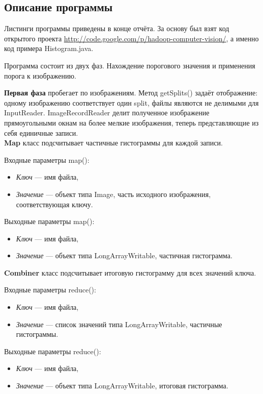 \documentclass[12pt,a4paper]{extarticle} %
\begin{document}
\subsection{Описание программы}
    Листинги программы приведены в конце отчёта. За основу был взят код открытого проекта \href{http://code.google.com/p/hadoop-computer-vision/}{http://code.google.com/p/hadoop-computer-vision/}, а именно код примера Histogram.java.

    Программа состоит из двух фаз. Нахождение порогового значения и применения порога к изображению.

    \textbf{Первая фаза} пробегает по изображениям. Метод getSplits() задаёт отображение: одному изображению соответствует один split, файлы являются не делимыми для InputReader. ImageRecordReader делит полученное изображение прямоугольными окнам на более мелкие изображения, теперь представляющие из себя единичные записи.\\[5pt]

    \noindent \textbf{Map} класс подсчитывает частичные гистограммы для каждой записи. 

    \noindent Входные параметры map():
    \begin{itemize}
        \item[] \textit{Ключ} --- имя файла,
        \item[] \textit{Значение} --- объект типа Image, часть исходного изображения, соответствующая ключу.
    \end{itemize}

    \noindent Выходные параметры map():
    \begin{itemize}
        \item[] \textit{Ключ} --- имя файла,
        \item[] \textit{Значение} --- объект типа LongArrayWritable, частичная гистограмма.
    \end{itemize}

    \noindent \textbf{Combiner} класс подсчитывает итоговую гистограмму для всех значений ключа. 

    \noindent Входные параметры reduce():
    \begin{itemize}
        \item[] \textit{Ключ} --- имя файла,
        \item[] \textit{Значение} --- список значений типа LongArrayWritable, частичные гистограммы.
    \end{itemize}

    \noindent Выходные параметры reduce():
    \begin{itemize}
        \item[] \textit{Ключ} --- имя файла,
        \item[] \textit{Значение} --- объект типа LongArrayWritable, итоговая гистограмма.
    \end{itemize}
\end{document}

